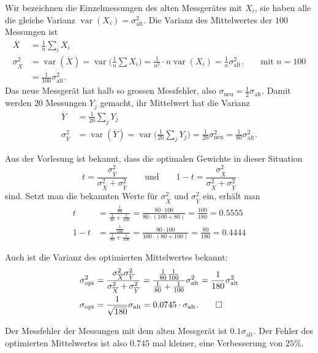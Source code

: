 \begin{loesung}
Wir bezeichnen die Einzelmessungen des alten Messgerätes mit $X_i$, sie
haben alle die gleiche Varianz $\operatorname{var}(X_i)=\sigma_{\text{alt}}^2$.
Die Varianz des Mittelwertes der $100$ Messungen ist
\begin{align*}
\overline X
&=
\frac1n\sum_i X_i
\\
\sigma_{\overline X}^2
&=
\operatorname{var}(\overline X)
=
\operatorname{var}\biggl(\frac1n\sum X_i\biggr)
=
\frac1{n^2}\cdot n\operatorname{var}(X_i)=\frac1n\sigma_{\text{alt}}^2.
\qquad\text{mit $n=100$}
\\
&=\frac1{100}\sigma_{\text{alt}}^2.
\end{align*}
Das neue Messgerät hat halb so grossen Messfehler, also
$\sigma_{\text{neu}}=\frac12\sigma_{\text{alt}}$.
Damit werden $20$ Messungen $Y_j$ gemacht, ihr Mittelwert hat die Varianz
\begin{align*}
\overline Y
&=
\frac1{20}\sum_j Y_j
\\
\sigma_{\overline Y}^2
&=
\operatorname{var}(\overline Y)
=
\operatorname{var}\biggl(\frac1{20}\sum_j Y_j\biggr)
=
\frac1{20}\sigma_{\text{neu}}^2
=
\frac1{80}\sigma_{\text{alt}}^2.
\end{align*}
\begin{teilaufgaben}
\item
Aus der Vorlesung ist bekannt, dass die optimalen Gewichte in dieser
Situation
\[
t
=
\frac{\sigma_{\overline Y}^2}{\sigma_{\overline X}^2 + \sigma_{\overline Y}^2}
\qquad\text{und}\qquad
1-t
=
\frac{\sigma_{\overline X}^2}{\sigma_{\overline X}^2 + \sigma_{\overline Y}^2}
\]
sind.
Setzt man die bekannten Werte für $\sigma_{\overline X}^2$ und
$\sigma_{\overline Y}^2$ ein, erhält man
\begin{align*}
t
&=
\frac{\frac1{80}}{\frac1{80}+\frac1{100}}
=
\frac{80\cdot 100}{80\cdot(100+80)}
=
\frac{100}{180}=0.5555
\\
1-t
&=
\frac{\frac1{100}}{\frac1{80}+\frac1{100}}
=
\frac{80\cdot 100}{100\cdot(80+100)}
=
\frac{80}{180}
=
0.4444
\end{align*}
\item
Auch ist die Varianz des optimierten Mittelwertes bekannt:
\begin{align*}
\sigma_{\text{opt}}^2
&=
\frac{\sigma_{\overline X}^2\sigma_{\overline Y}^2}{\sigma_{\overline X}^2 +\sigma_{\overline Y}^2}
=
\frac{\frac1{80}\frac1{100}}{\frac1{80}+\frac1{100}}\sigma_{\text{alt}}^2
=
\frac1{180}\sigma_{\text{alt}}^2
\\
\sigma_{\text{opt}}
&=
\frac1{\sqrt{180}}\sigma_{\text{alt}}
=
0.0745\cdot\sigma_{\text{alt}}.
\qedhere
\end{align*}
\item
Der Messfehler der Messungen mit dem alten Messgerät ist
$0.1\sigma_{\text{alt}}$.
Der Fehler des optimierten Mittelwertes ist also $0.745$ mal kleiner,
eine Verbesserung von $25\%$.
\end{teilaufgaben}
\end{loesung}

